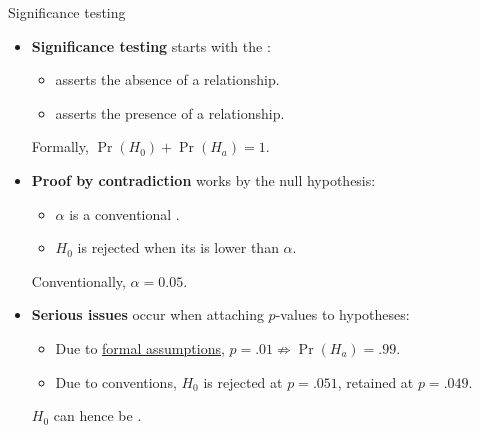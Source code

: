 \documentclass{beamer}
\begin{document}
	\begin{frame}[t]{Significance testing}

	\begin{itemize}
		\item \textbf{Significance testing} starts with the :
		
			\begin{itemize}
				\item {} asserts the absence of a relationship.
				\item {} asserts the presence of a relationship.
			\end{itemize}

			Formally, $\Pr(H_0)+\Pr(H_a)=1$.

		\item \textbf{Proof by contradiction} works by  the null hypothesis:
		
			\begin{itemize}
				\item $\alpha$ is a conventional .
				\item $H_0$ is rejected when its  is lower than $\alpha$.
			\end{itemize}
			
			Conventionally, $\alpha = 0.05$.
				
		\item \textbf{Serious issues} occur when attaching $p$-values to hypotheses:
		
			\begin{itemize}
				\item Due to \href{http://en.wikipedia.org/wiki/Jeffreys-Lindley_paradox}{formal assumptions}, $p=.01 \nRightarrow \Pr(H_a)=.99$.
				\item Due to conventions, $H_0$ is rejected at $p = .051$, retained at $p = .049$.
			\end{itemize}
		
		$H_0$ can hence be .
		
	\end{itemize}

	\end{frame}
		
\end{document}
